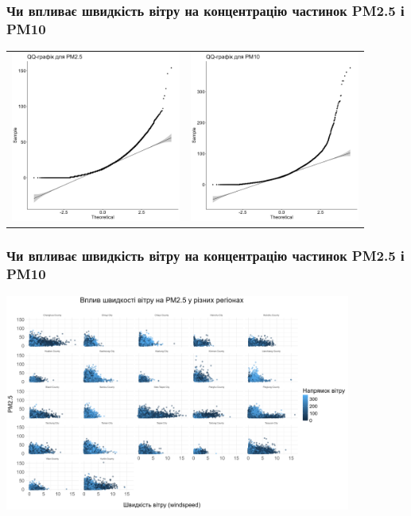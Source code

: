\documentclass{beamer}
\begin{document}
\begin{frame}
  \frametitle{Чи впливає швидкість вітру на концентрацію частинок PM2.5 і PM10}

  \begin{tabular}{cc}
    \includegraphics[height=2.2in]{plots/question1/qq_pm2_5.png} &
    \includegraphics[height=2.2in]{plots/question1/qq_pm10.png}
  \end{tabular}
\end{frame}

\begin{frame}
  \frametitle{Чи впливає швидкість вітру на концентрацію частинок PM2.5 і PM10}

  \begin{center}
    \includegraphics[height=2.8in]{plots/question1/scatter_pm2_5_region.png}
  \end{center}
\end{frame}
\end{document}
